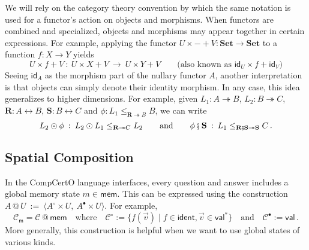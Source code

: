 \documentclass[acmsmall,screen,review,anonymous]{acmart}
\newcommand{\kw}[1]{\ensuremath{ \mathsf{#1} }}
\newcommand{\que}{\circ}
\newcommand{\ans}{\bullet}
\newcommand{\vcomp}{\fatsemi}
\begin{document}
\begin{remark} %
We will rely on the category theory convention
by which the same notation is used
for a functor's action on objects and morphisms.
When functors are combined and specialized,
objects and morphisms
may appear together in certain expressions.
For example,
applying the functor $U \times {-} + V : \mathbf{Set} \rightarrow \mathbf{Set}$
to a function $f : X \rightarrow Y$ yields
\[
  U \times f + V \: : \: U \times X + V \:\rightarrow\: U \times Y + V
  \qquad \text{(also known as }
  \kw{id}_U \times f + \kw{id}_V
  \text{)}
\]
Seeing $\kw{id}_A$ as the morphism part of the nullary functor $A$,
another interpretation is that
objects can simply denote their identity morphism.
%
In any case,
this idea generalizes to higher dimensions.
For example, given
$L_1 : A \twoheadrightarrow B$,
$L_2 : B \twoheadrightarrow C$,
$\mathbf{R} : A \leftrightarrow B$,
$\mathbf{S} : B \leftrightarrow C$ and
$\phi : L_1 \le_{\mathbf{R} \twoheadrightarrow B} B$,
we can write
\[
  L_2 \odot \phi \: : \:
  L_2 \odot L_1 \le_{\mathbf{R} \twoheadrightarrow C} L_2
  \qquad \text{and} \qquad
  \phi \vcomp \mathbf{S} \: : \:
  L_1 \le_{\mathbf{R} \vcomp \mathbf{S} \twoheadrightarrow \mathbf{S}} C
  \,.
\]
\end{remark}

\subsection{Spatial Composition} \label{sec:overview:scomp} %


In the CompCertO language interfaces,
every question and answer includes a global memory state $m \in \kw{mem}$.
This can be expressed using the construction
$
  A \mathbin@ U \: := \:
    \langle A^\que \times U, \: A^\ans \times U \rangle
$.
For example,
\[
  \mathcal{C}_\kw{m} = \mathcal{C} \mathbin@ \kw{mem}
  \quad \text{where} \quad
  \mathcal{C}^\que := \{ f(\vec{v}) \mid f \in \kw{ident}, \vec{v} \in \kw{val}^* \}
  \quad \text{and} \quad
  \mathcal{C}^\ans := \kw{val}
  \,.
\]
More generally,
this construction
is helpful when we want to use global states of various kinds.
\end{document}
